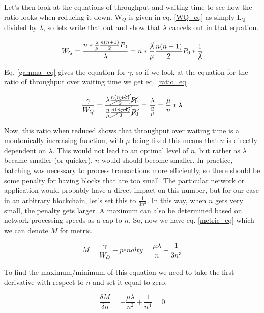 \documentclass[conference]{IEEEtran}
\begin{document}
Let's then look at the equations of throughput and waiting time to see how the ratio looks when reducing it 
down. W$_Q$ is given in eq. \ref{WQ_eq} as simply L$_Q$ divided by $\lambda$, so lets write that out and 
show that $\lambda$ cancels out in that equation.

\begin{equation}
W_Q=\frac{n\ast\frac{\lambda}{\mu}\frac{n(n+1)}{2}P_0}{\lambda}=n\ast\frac{\cancel{\lambda}}{\mu}\frac{n(n+1)}{2}P_0\ast\frac{1}{\cancel{\lambda}}\label{WQ_reduced}
\end{equation}

Eq. \ref{gamma_eq} gives the equation for $\gamma$, so if we look at the equation for the ratio of throughput over waiting time we get eq. \ref{ratio_eq}. 

\begin{equation}
\frac{\gamma}{W_Q}=\frac{\lambda\cancel{\frac{n(n+1)}{2}}\cancel{P_0}}{\frac{n}{\mu}\cancel{\frac{n(n+1)}{2}}\cancel{P_0}}=\frac{\lambda}{\frac{n}{\mu}}=\frac{\mu}{n}\ast\lambda\label{ratio_eq}
\end{equation}

Now, this ratio when reduced shows that throughput over waiting time is a montonically increasing function, 
with $\mu$ being fixed this means that $n$ is directly dependent on $\lambda$. This would not lead to an optimal 
level of $n$, but rather as $\lambda$ became smaller (or quicker), $n$ would should become smaller. In practice, 
batching was necessary to process transactions more efficiently, so there should be some penalty for having blocks 
that are too small. The particular network or application would probably have a direct impact on this number, but
for our case in an arbitrary blockchain, let's set this to $\frac{1}{3n^3}$. In this way, when $n$ gets very small, 
the penalty gets larger. A maximum can also be determined based on network processing speeds as a cap to 
$n$. So, now we have eq. \ref{metric_eq} which we can denote $M$ for metric.

\begin{equation}
M=\frac{\gamma}{W_Q}-penalty=\frac{\mu\lambda}{n}-\frac{1}{3n^3}\label{metric_eq}
\end{equation}

To find the maximum/minimum of this equation we need to take the first derivative with respect to $n$ 
and set it equal to zero. 

\begin{equation}
\frac{\delta M}{\delta n}=-\frac{\mu\lambda}{n^2}+\frac{1}{n^4}=0\label{metric_deriv}
\end{equation}
\end{document}
